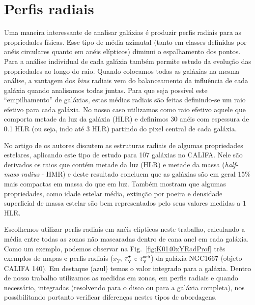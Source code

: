 \section{Perfis radiais}
\label{sec:amostra:rad}

Uma maneira interessante de analisar galáxias é produzir perfis radiais para as propriedades
físicas. Esse tipo de média azimutal (tanto em classes definidas por anéis circulares quanto em
anéis elípticos) diminui o espalhamento dos pontos. Para a análise individual de cada galáxia também
permite estudo da evolução das propriedades ao longo do raio. Quando colocamos todas as galáxias na
mesma análise, a vantagem dos {\em bins} radiais vem do balanceamento da influência de cada galáxia
quando analisamos todas juntas. Para que seja possível este ``empilhamento'' de galáxias, estas
médias radiais são feitas definindo-se um raio efetivo para cada galáxia. No nosso caso utilizamos
como raio efetivo aquele que comporta metade da luz da galáxia (HLR) e definimos 30 anéis com
espessura de 0.1 HLR (ou seja, indo até 3 HLR) partindo do pixel central de cada galáxia.

No artigo de \citet{GonzalezDelgado.etal.2014a} os autores discutem as estruturas radiais de algumas
propriedades estelares, aplicando este tipo de estudo para 107 galáxias no CALIFA. Nele são
derivados os raios que contém metade da luz (HLR) e metade da massa ({\em half-mass radius} - HMR) e
deste resultado concluem que as galáxias são em geral 15\% mais compactas em massa do que em luz.
Também mostram que algumas propriedades, como idade estelar média, extinção por poeira e densidade
superficial de massa estelar são bem representados pelo seus valores medidas a 1 HLR.

Escolhemos utilizar perfis radiais em anéis elípticos neste trabalho, calculando a média entre todas
as zonas não mascaradas dentro de cana anel em cada galáxia. Como um exemplo, podemos observar na
Fig.\ \ref{fig:K0140xYRadProf} três exemplos de mapas e perfis radiais ($x_Y$, $\tau_{\mathrm{V}}^\star$ e $\tau_{\mathrm{V}}^{\mathrm{neb}}$)
da galáxia NGC1667 (objeto CALIFA 140). Em destaque (azul) temos o valor integrado para a galáxia.
Dentro de nosso trabalho utilizamos as medidas em zonas, em perfis radiais e quando necessário,
integradas (resolvendo para o disco ou para a galáxia completa), nos possibilitando portanto
verificar diferenças nestes tipos de abordagens.

